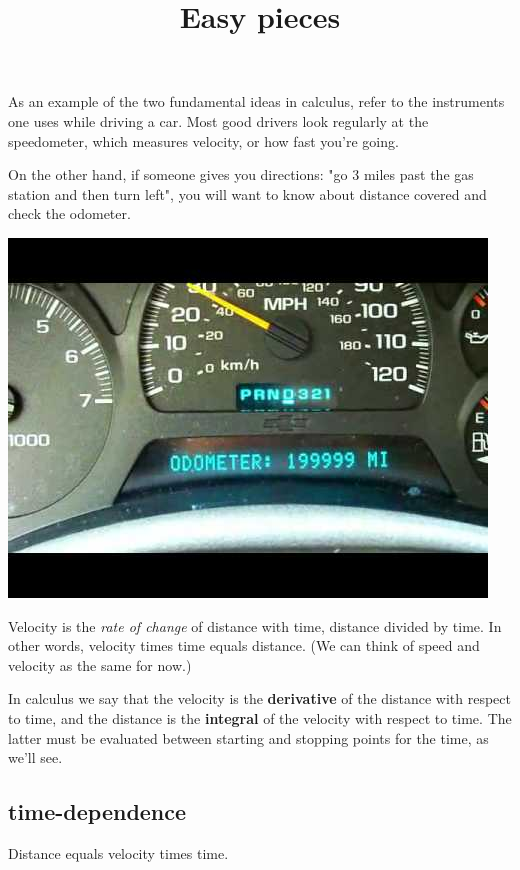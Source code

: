 \documentclass[11pt, oneside]{article}
\title{Easy pieces}
\date{}
\begin{document}
\maketitle
\Large

\hypertarget{first_calculus}{}
As an example of the two fundamental ideas in calculus, refer to the instruments one uses while driving a car. Most good drivers look regularly at the speedometer, which measures velocity, or how fast you're going.  

On the other hand, if someone gives you directions:  "go 3 miles past the gas station and then turn left", you will want to know about distance covered and check the odometer.

\begin{center} \includegraphics [scale=0.5] {hqdefault.jpg} \end{center}

Velocity is the \emph{rate of change} of distance with time, distance divided by time.  In other words, velocity times time equals distance.  (We can think of speed and velocity as the same for now.)

In calculus we say that the velocity is the \textbf{derivative} of the distance with respect to time, and the distance is the \textbf{integral} of the velocity with respect to time.  The latter must be evaluated between starting and stopping points for the time, as we'll see.

\subsection*{time-dependence}
Distance equals velocity times time.
\end{document}
